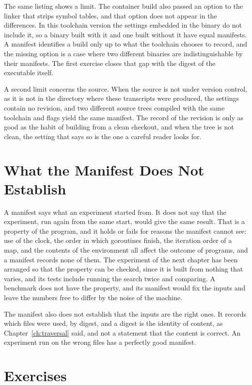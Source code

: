 The same listing shows a limit. The container build also passed an option to the linker that strips symbol tables, and that option does not appear in the differences. In this toolchain version the settings embedded in the binary do not include it, so a binary built with it and one built without it have equal manifests. A manifest identifies a build only up to what the toolchain chooses to record, and the missing option is a case where two different binaries are indistinguishable by their manifests. The first exercise closes that gap with the digest of the executable itself.

A second limit concerns the source. When the source is not under version control, as it is not in the directory where these transcripts were produced, the settings contain no revision, and two different source trees compiled with the same toolchain and flags yield the same manifest. The record of the revision is only as good as the habit of building from a clean checkout, and when the tree is not clean, the setting that says so is the one a careful reader looks for.

\section{What the Manifest Does Not Establish}

A manifest says what an experiment started from. It does not say that the experiment, run again from the same start, would give the same result. That is a property of the program, and it holds or fails for reasons the manifest cannot see: use of the clock, the order in which goroutines finish, the iteration order of a map, and the contents of the environment all affect the outcome of programs, and a manifest records none of them. The experiment of the next chapter has been arranged so that the property can be checked, since it is built from nothing that varies, and its tests include running the search twice and comparing. A benchmark does not have the property, and its manifest would fix the inputs and leave the numbers free to differ by the noise of the machine.

The manifest also does not establish that the inputs are the right ones. It records which files were used, by digest, and a digest is the identity of content, as Chapter~\ref{ch:traversal} said, and not a statement that the content is correct. An experiment run on the wrong files has a perfectly good manifest.

\section*{Exercises}

